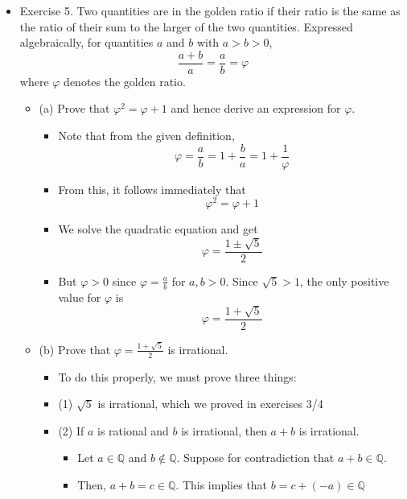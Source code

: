 \documentclass{article}
\begin{document}
\begin{itemize}
\begin{itemize}
        \item This proof also generalises for $\sqrt{p}$ where $p$ is a prime since only then can we claim that if $p \mid a^2 \Rightarrow p \mid a$
    \end{itemize}
    \item Exercise 5. Two quantities are in the golden ratio if their ratio is the same as the ratio of their sum to the larger of the two quantities. Expressed algebraically, for quantities $a$ and $b$ with $a > b > 0$,
    \[
    \frac{a+b}{a} = \frac{a}{b} = \varphi
    \]
    where $\varphi$ denotes the golden ratio.
    \begin{itemize}
        \item (a) Prove that $\varphi^2 = \varphi + 1$ and hence derive an expression for $\varphi$.
        \begin{itemize}
            \item Note that from the given definition,
            \[
            \varphi = \frac{a}{b} = 1 + \frac{b}{a} = 1 + \frac{1}{\varphi}
            \]
            \item From this, it follows immediately that
            \[
            \varphi^2 = \varphi + 1
            \]
            \item We solve the quadratic equation and get
            \[
            \varphi = \frac{1 \pm \sqrt{5}}{2}
            \]
            \item But $\varphi > 0$ since $\varphi = \frac{a}{b}$ for $a,b > 0$. Since $\sqrt{5} > 1$, the only positive value for $\varphi$ is
            \[
            \varphi = \frac{1+\sqrt{5}}{2}
            \]
        \end{itemize}
        \item (b) Prove that $\varphi = \frac{1+\sqrt{5}}{2}$ is irrational.
        \begin{itemize}
            \item To do this properly, we must prove three things:
            \item (1) $\sqrt{5}$ is irrational, which we proved in exercises 3/4
            \item (2) If $a$ is rational and $b$ is irrational, then $a+b$ is irrational.
            \begin{itemize}
                \item Let $a \in \mathbb{Q}$ and $b \notin \mathbb{Q}$. Suppose for contradiction that $a+b \in \mathbb{Q}$.
                \item Then, $a+b = c \in \mathbb{Q}$. This implies that $b = c + (-a) \in \mathbb{Q}$

\end{itemize}
\end{itemize}
\end{itemize}
\end{itemize}
\end{document}
